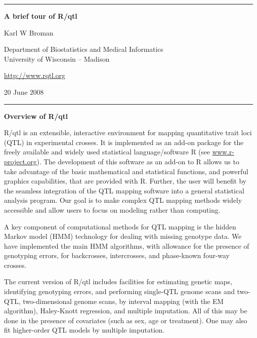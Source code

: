 \documentclass[10pt,letterpaper]{article}
\begin{document}
\begin{center}
\rule{7.0in}{1mm} \vspace{0mm}

{\Large \textbf{A brief tour of R/qtl}} \vspace{4mm}

{\large Karl W Broman} \vspace{2mm}

Department of Biostatistics and Medical Informatics\\
University of Wisconsin -- Madison

\vspace{2mm}
\href{http://www.rqtl.org}{http://www.rqtl.org}
\vspace{2mm}

20 June 2008 %

\rule{7.0in}{1mm} 
\end{center}

\noindent \textbf{Overview of R/qtl} \vspace{6pt}

R/qtl is an extensible, interactive environment for mapping
quantitative trait loci (QTL) in experimental crosses. It is
implemented as an add-on package for the freely available and widely
used statistical language/software R (see
\href{http://www.r-project.org}{www.r-project.org}). The development
of this software as an add-on to R allows us to take advantage of the
basic mathematical and statistical functions, and powerful graphics
capabilities, that are provided with R. Further, the user will benefit
by the seamless integration of the QTL mapping software into a general
statistical analysis program.  Our goal is to make complex QTL mapping
methods widely accessible and allow users to focus on modeling rather
than computing.

A key component of computational methods for QTL mapping is the hidden
Markov model (HMM) technology for dealing with missing genotype
data. We have implemented the main HMM algorithms, with allowance for
the presence of genotyping errors, for backcrosses, intercrosses, and
phase-known four-way crosses.

The current version of R/qtl includes facilities for estimating
genetic maps, identifying genotyping errors, and performing single-QTL
genome scans and two-QTL, two-dimensional genome scans, by interval
mapping (with the EM algorithm), Haley-Knott regression, and multiple
imputation. All of this may be done in the presence of covariates
(such as sex, age or treatment). One may also fit higher-order QTL models
by multiple imputation.
\end{document}
